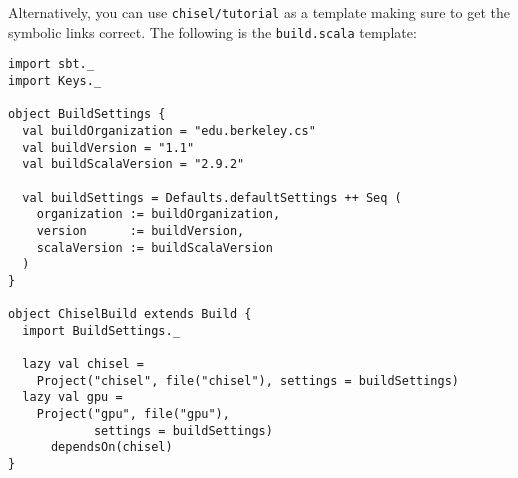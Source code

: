 \documentclass[10pt]{article}
\begin{document}
Alternatively, you can use \verb+chisel/tutorial+ as a template making
sure to get the symbolic links correct.
The following is the \verb+build.scala+ template:

\begin{verbatim}
import sbt._
import Keys._

object BuildSettings {
  val buildOrganization = "edu.berkeley.cs"
  val buildVersion = "1.1"
  val buildScalaVersion = "2.9.2"

  val buildSettings = Defaults.defaultSettings ++ Seq (
    organization := buildOrganization,
    version      := buildVersion,
    scalaVersion := buildScalaVersion
  )
}

object ChiselBuild extends Build {
  import BuildSettings._

  lazy val chisel = 
    Project("chisel", file("chisel"), settings = buildSettings)
  lazy val gpu =
    Project("gpu", file("gpu"), 
            settings = buildSettings) 
      dependsOn(chisel)
}
\end{verbatim}
\end{document}
